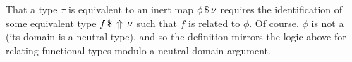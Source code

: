 \documentclass[sigplan,screen]{acmart}
\begin{document}
\begin{AgdaAlign}
\begin{code}%
%
\>[2]\AgdaSpace{}%
\AgdaSymbol{\{}\AgdaSymbol{\}}\AgdaSpace{}%
\AgdaSymbol{\{}\AgdaSpace{}%
\AgdaSymbol{=}\AgdaSpace{}%
\AgdaSpace{}%
\AgdaSpace{}%
\AgdaSymbol{\}}\AgdaSpace{}%
\AgdaSpace{}%
\AgdaSpace{}%
\AgdaSymbol{=}\<%
\\
\>[2][@{}l@{\AgdaIndent{0}}]%
\>[6]\AgdaSpace{}%
\AgdaSymbol{\{}\AgdaSymbol{\}}\AgdaSpace{}%
\AgdaSymbol{(}\AgdaSpace{}%
\AgdaSymbol{:}\AgdaSpace{}%
\AgdaSpace{}%
\AgdaSpace{}%
\AgdaSymbol{)}\<%
\\
%
\>[6]\AgdaSymbol{\{}\AgdaSpace{}%
\AgdaSymbol{:}\AgdaSpace{}%
\AgdaSpace{}%
\AgdaSpace{}%
\AgdaSymbol{\}}\<%
\\
%
\>[6]\AgdaSymbol{\{}\AgdaSpace{}%
\AgdaSymbol{:}\AgdaSpace{}%
\AgdaSpace{}%
\AgdaSpace{}%
\AgdaSymbol{\}}\AgdaSpace{}%
\<%
\\
%
\>[6]\AgdaSpace{}%
\AgdaSpace{}%
\AgdaSpace{}%
\AgdaSpace{}%
\<%
\\
%
\>[6]\AgdaSpace{}%
\AgdaSpace{}%
\AgdaSpace{}%
\AgdaSpace{}%
\AgdaSpace{}%
\AgdaSpace{}%
\AgdaSpace{}%
\AgdaSymbol{(}\AgdaSpace{}%
\AgdaSpace{}%
\AgdaSpace{}%
\AgdaSpace{}%
\AgdaSymbol{)}\<%
\end{code}
\end{AgdaAlign}

That a type $\tau$ is equivalent to an inert map ${\phi} \, \mathdollar \, \nu$ requires the identification of some equivalent type ${f} \, \mathdollar \, \Uparrow\, \nu$ such that $f$ is related to $\phi$. Of course, $\phi$ is not a  (its domain is a neutral type), and so the definition  mirrors the logic above for relating functional types modulo a neutral domain argument.
\end{document}
